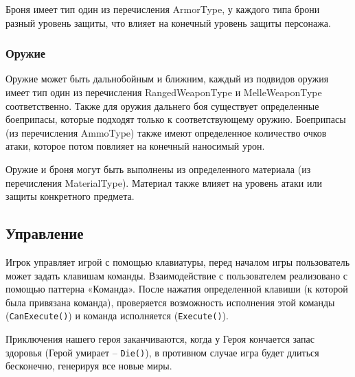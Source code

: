 \documentclass[a4paper,10pt]{article}
\begin{document}
Броня имеет тип один из перечисления ArmorType, у каждого типа брони разный уровень защиты, что влияет на конечный уровень защиты персонажа. 

\subsubsection*{Оружие}

Оружие может быть дальнобойным и ближним, каждый из подвидов оружия имеет тип один из перечисления RangedWeaponType и MelleWeaponType соответственно. Также для оружия дальнего боя существует определенные боеприпасы, которые подходят только к соответствующему оружию.  Боеприпасы (из перечисления AmmoType) также имеют определенное количество очков атаки, которое потом повлияет на конечный наносимый урон. 

Оружие и броня могут быть выполнены из определенного материала (из перечисления MaterialType). Материал также влияет на уровень атаки или защиты конкретного предмета.

\subsection*{Управление}

Игрок управляет игрой с помощью клавиатуры, перед началом игры пользователь может задать клавишам команды. Взаимодействие с пользователем реализовано с помощью паттерна «Команда». После нажатия определенной клавиши (к которой была привязана команда), проверяется возможность исполнения этой команды (\texttt{CanExecute()}) и команда исполняется (\texttt{Execute()}). 

Приключения нашего героя заканчиваются, когда у Героя кончается запас здоровья (Герой умирает -- \texttt{Die()}), в противном случае игра будет длиться бесконечно, генерируя все новые миры. 
\end{document}
